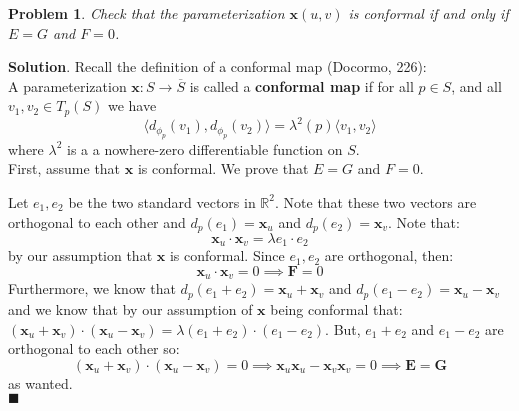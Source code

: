 \documentclass[12pt]{article}
\renewcommand{\=}[1]{\stackrel{#1}{=}} %
\providecommand{\RR}{\mathbb{R}}
\newtheorem{p}{Problem}[section]
\theoremstyle{definition}
\newenvironment{s}{%
        \begin{trivlist} \item \textbf{Solution}. }{%
            \hspace*{\fill} $\blacksquare$\end{trivlist}}%
\begin{document}
\newpage
\begin{p}
    Check that the parameterization $\mathbf{x}(u,v)$ is conformal if and only if $E = G$ and $F = 0$.
\end{p}
\begin{s}
    Recall the definition of a conformal map (Docormo, 226): \\

    A parameterization $\mathbf{x}: S \to \overline{S}$ is called a \textbf{conformal map} if for all $p\in S$, and all $v_1,v_2\in T_p(S)$ we have
    \[ \langle d_{\phi_p}(v_1),d_{\phi_p}(v_2)\rangle = \lambda^2(p)\langle v_1,v_2\rangle \]
    where $\lambda^2$ is a a nowhere-zero differentiable function on $S$.\\

    First, assume that $\mathbf{x}$ is conformal. We prove that $E=G$ and $F = 0$.

    Let $e_1, e_2$ be the two standard vectors in $\RR^2$. Note that these two vectors are orthogonal to each other and $d_p(e_1) = \mathbf{x}_u$ and 
    $d_p(e_2) = \mathbf{x}_v$. Note that:
    \[ \mathbf{x}_u \cdot \mathbf{x}_v = \lambda e_1\cdot e_2\]
    by our assumption that $\mathbf{x}$ is conformal. Since $e_1, e_2$ are orthogonal, then:
    \[ \mathbf{x}_u \cdot \mathbf{x}_v = 0 \implies \mathbf{F} = 0 \]
    Furthermore, we know that $d_p(e_1+e_2) = \mathbf{x}_u + \mathbf{x}_v$ and $d_p(e_1-e_2) = \mathbf{x}_u - \mathbf{x}_v$ and
    we know that by our assumption of $\mathbf{x}$ being conformal that: $(\mathbf{x}_u+\mathbf{x}_v)\cdot(\mathbf{x}_u-\mathbf{x}_v) = \lambda(e_1+e_2)\cdot(e_1-e_2)$.
    But, $e_1+e_2$ and $e_1-e_2$ are orthogonal to each other so:
    \[ (\mathbf{x}_u + \mathbf{x}_v)\cdot(\mathbf{x}_u - \mathbf{x}_v) = 0 \implies \mathbf{x}_u\mathbf{x}_u - \mathbf{x}_v\mathbf{x}_v = 0 
        \implies \mathbf{E} = \mathbf{G} \]
    as wanted. \\


\end{s}
\end{document}
